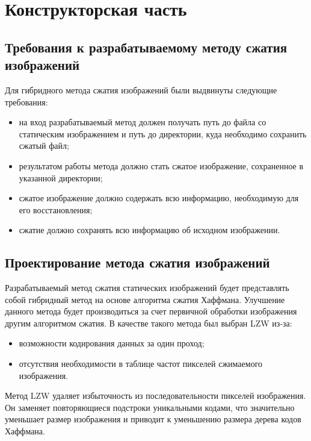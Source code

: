 \chapter{Конструкторская часть}

\section{Требования к разрабатываемому методу сжатия изображений}

Для гибридного метода сжатия изображений были выдвинуты следующие требования:
\begin{itemize}
    \item на вход разрабатываемый метод должен получать путь до файла со статическим изображением и путь до директории, куда необходимо сохранить сжатый файл;
    \item результатом работы метода должно стать сжатое изображение, сохраненное в указанной директории;
    \item сжатое изображение должно содержать всю информацию, необходимую для его восстановления;
    \item сжатие должно сохранять всю информацию об исходном изображении.
\end{itemize}

\section{Проектирование метода сжатия изображений}

Разрабатываемый метод сжатия статических изображений будет представлять собой гибридный метод на основе алгоритма сжатия Хаффмана. Улучшение данного метода будет производиться за счет первичной обработки изображения другим алгоритмом сжатия. В качестве такого метода был выбран LZW из-за:
\begin{itemize}
    \item возможности кодирования данных за один проход;
    \item отсутствия необходимости в таблице частот пикселей сжимаемого изображения.
\end{itemize}

Метод LZW удаляет избыточность из последовательности пикселей изображения. Он заменяет повторяющиеся подстроки уникальными кодами, что значительно уменьшает размер изображения и приводит к уменьшению размера дерева кодов Хаффмана. 

